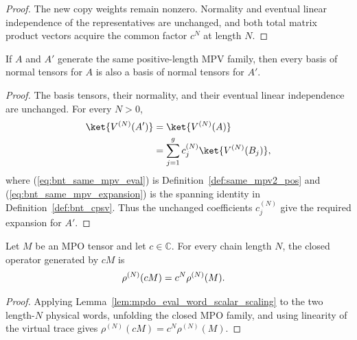 \begin{proof}\leanok
    The new copy weights remain nonzero. Normality and eventual linear
    independence of the representatives are unchanged, and both total matrix
    product vectors acquire the common factor $c^N$ at length $N$.
\end{proof}

\begin{lemma}
    \label{thm:mpdo_cpsv_bnt_of_same_mpv}
    \leanok
    If $A$ and $A'$ generate the same positive-length MPV family, then every
    basis of normal tensors for $A$ is also a basis of normal tensors for
    $A'$.
\end{lemma}

\begin{proof}\leanok
    The basis tensors, their normality, and their eventual linear independence
    are unchanged. For every $N>0$,
    \begin{align}
        \ket{V^{(N)}(A')}
         & =\ket{V^{(N)}(A)}
        \label{eq:bnt_same_mpv_eval}                    \\
         & =\sum_{j=1}^{g} c_j^{(N)}\ket{V^{(N)}(B_j)},
        \label{eq:bnt_same_mpv_expansion}
    \end{align}
    where (\ref{eq:bnt_same_mpv_eval}) is Definition~\ref{def:same_mpv2_pos} and
    (\ref{eq:bnt_same_mpv_expansion}) is the spanning identity in
    Definition~\ref{def:bnt_cpsv}. Thus the unchanged
    coefficients $c_j^{(N)}$ give the required expansion for $A'$.
\end{proof}

\begin{lemma}
    \label{thm:mpdo_mpo_scalar_scaling}
    \leanok
    Let $M$ be an MPO tensor and let $c\in\mathbb C$. For every chain length
    $N$, the closed operator generated by $cM$ is
    \begin{align}
        \rho^{(N)}(cM) & =c^N\rho^{(N)}(M).
        \notag
    \end{align}
\end{lemma}

\begin{proof}\leanok
    Applying Lemma~\ref{lem:mpdo_eval_word_scalar_scaling} to the two length-$N$
    physical words, unfolding the closed MPO family, and using linearity of the
    virtual trace gives $\rho^{(N)}(cM)=c^N\rho^{(N)}(M)$.
\end{proof}

